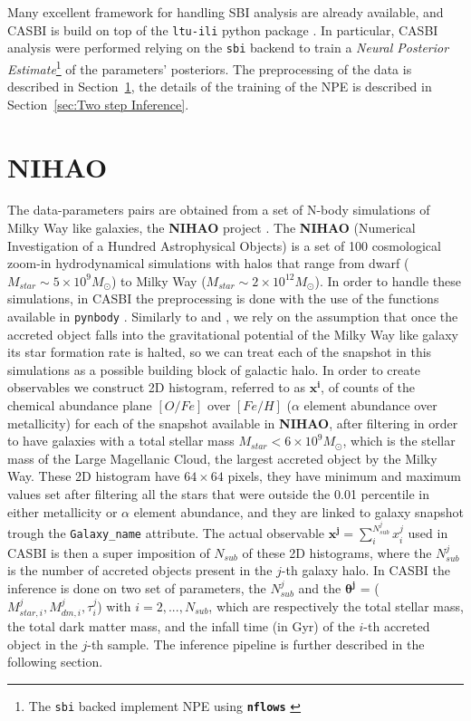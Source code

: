 Many excellent framework for handling SBI analysis are already available, and CASBI is build on top of the \texttt{ltu-ili} python package \cite{hoLtUILIAllinOneFramework2024}. In particular, CASBI analysis were performed relying on the \texttt{sbi} backend \cite{tejero-canteroSbiToolkitSimulationbased2020} to train a \textit{Neural Posterior Estimate}\footnote{The \texttt{sbi} backed implement NPE using \textbf{\texttt{nflows}} \cite{durkanNflowsNormalizingFlows2020}} of the parameters' posteriors. The preprocessing of the data is described in Section~\ref{sec:NIHAO}, the details of the training of the NPE is described in Section~\ref{sec:Two step Inference}.


\section{NIHAO}\label{sec:NIHAO}
The data-parameters pairs are obtained from a set of N-body simulations of Milky Way like galaxies, the \textbf{NIHAO} project \cite{wangNIHAOProjectReproducing2015}. The \textbf{NIHAO} (Numerical Investigation of a Hundred Astrophysical Objects) is a set of 100 cosmological zoom-in hydrodynamical simulations with halos that range from dwarf ($M_{star} \sim 5 \times 10^9 M_\odot$) to Milky Way ($M_{star} \sim 2 \times 10^12 M_\odot$). In order to handle these simulations, in CASBI the preprocessing is done with the use of the functions available in \texttt{pynbody} \cite{pontzenPynbodyNBodySPH2013}. Similarly to \cite{cunninghamReadingCARDsImprint2022} and \cite{deasonUnravellingMassSpectrum2023}, we rely on the assumption that once the accreted object falls into the gravitational potential of the Milky Way like galaxy its star formation rate is halted, so we can treat each of the snapshot in this simulations as a possible building block of galactic halo. In order to create observables we construct 2D histogram, referred to as \textbf{$\mathbf{x^i}$}, of counts of the chemical abundance plane $[O/Fe]$ over $[Fe/H]$ ($\alpha$ element abundance over metallicity) for each of the snapshot available in \textbf{NIHAO}, after filtering in order to have galaxies with a total stellar mass $M_{star} < 6 \times 10^9 M_\odot$, which is the stellar mass of the Large Magellanic Cloud, the largest accreted object by the Milky Way. These 2D histogram have $64 \times 64$ pixels, they have minimum and maximum values set after filtering all the stars that were outside the 0.01 percentile in either metallicity or $\alpha$ element abundance, and they are linked to galaxy snapshot trough the \texttt{Galaxy\_name} attribute. The actual observable \textbf{$\mathbf{x^j} = \sum_i^{N_{sub}^j} x^j_i$ } used in CASBI is then a super imposition of $N_{sub}$ of these 2D histograms, where the $N_{sub}^j$ is the number of accreted objects present in the $j$-th galaxy halo. In CASBI the inference is done on two set of parameters, the $N_{sub}^j$ and the \textbf{$\mathbf{\theta^j}$} = ($M_{star, i}^j, M_{dm, i}^j, \tau_i^j $) with $i=2, ..., N_{sub}$, which are respectively the total stellar mass, the total dark matter mass, and the infall time (in Gyr) of the $i$-th accreted object in the $j$-th sample. The inference pipeline is further described in  the following section.
  
